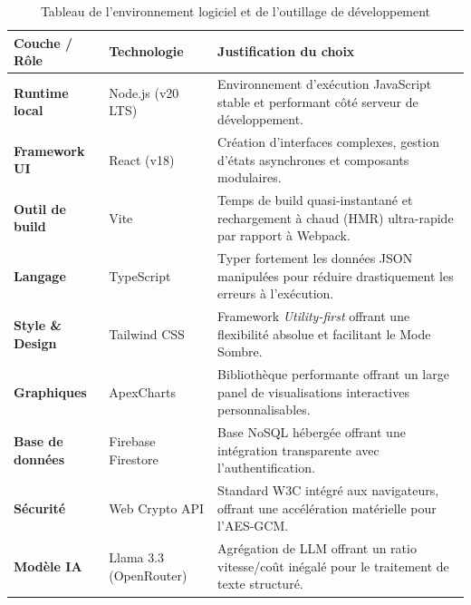 ﻿\documentclass[12pt,a4paper,oneside]{report} %
\begin{document}
\begin{table}[H]
\centering
\begin{tabularx}{\textwidth}{|l|l|X|}
\hline
\textbf{Couche / Rôle} & \textbf{Technologie} & \textbf{Justification du choix} \\ \hline
\textbf{Runtime local} & Node.js (v20 LTS) & Environnement d'exécution JavaScript stable et performant côté serveur de développement. \\ \hline
\textbf{Framework UI} & React (v18) & Création d'interfaces complexes, gestion d'états asynchrones et composants modulaires. \\ \hline
\textbf{Outil de build} & Vite & Temps de build quasi-instantané et rechargement à chaud (HMR) ultra-rapide par rapport à Webpack. \\ \hline
\textbf{Langage} & TypeScript & Typer fortement les données JSON manipulées pour réduire drastiquement les erreurs à l'exécution. \\ \hline
\textbf{Style \& Design} & Tailwind CSS & Framework \textit{Utility-first} offrant une flexibilité absolue et facilitant le Mode Sombre. \\ \hline
\textbf{Graphiques} & ApexCharts & Bibliothèque performante offrant un large panel de visualisations interactives personnalisables. \\ \hline
\textbf{Base de données} & Firebase Firestore & Base NoSQL hébergée offrant une intégration transparente avec l'authentification. \\ \hline
\textbf{Sécurité} & Web Crypto API & Standard W3C intégré aux navigateurs, offrant une accélération matérielle pour l'AES-GCM. \\ \hline
\textbf{Modèle IA} & Llama 3.3 (OpenRouter) & Agrégation de LLM offrant un ratio vitesse/coût inégalé pour le traitement de texte structuré. \\ \hline
\end{tabularx}
\caption{Tableau de l'environnement logiciel et de l'outillage de développement}
\end{table}
\end{document}
